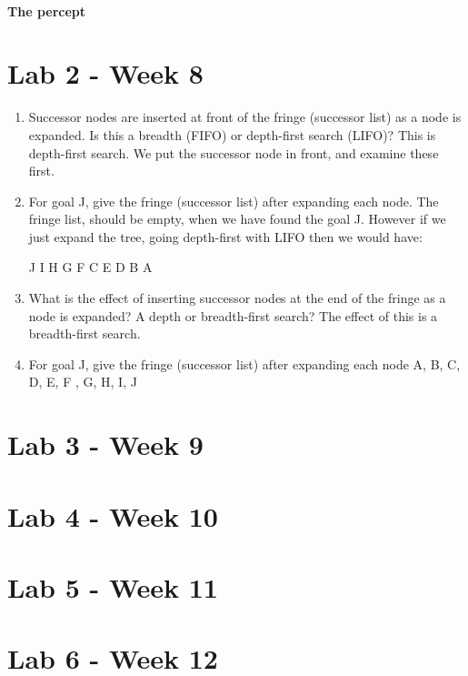 \documentclass{article}
\begin{document}
\paragraph{The percept }

\newpage
\section{Lab 2 - Week 8}%
\label{sec:lab_week_8}

\begin{enumerate}
  \item Successor nodes are inserted at front of the fringe (successor list) as
    a node is expanded. Is this a breadth (FIFO) or depth-first search (LIFO)?
    \subitem This is depth-first search. We put the successor node in front, and
    examine these first.

  \item For goal J, give the fringe (successor list) after expanding each node.
    \subitem The fringe list, should be empty, when we have found the goal J.
    However if we just expand the tree, going depth-first with LIFO then we
    would have: 
    \begin{center}
      J I H G F C E D B A 
    \end{center}
  \item What is the effect of inserting successor nodes at the end of the fringe
    as a node is expanded? A depth or breadth-first search?
    \subitem The effect of this is a breadth-first search.
  \item For goal J, give the fringe (successor list) after expanding each node
    \subitem A, B, C, D, E, F , G, H, I, J
\end{enumerate}

\newpage
\section{Lab 3 - Week 9}%
\label{sec:lab_week_9}


\newpage
\section{Lab 4 - Week 10}



\newpage
\section{Lab 5 - Week 11}


\newpage
\section{Lab 6 - Week 12}

\newpage
\printbibliography
\end{document}
